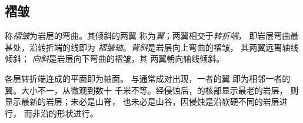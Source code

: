 \subsection{褶皱}

\begin{definition}[褶皱；背斜；向斜；褶皱轴]\label{def:g12:mountain-building:fold}
称\emph{褶皱}为岩层的弯曲。其倾斜的两翼
称为\emph{翼}；两翼相交于\emph{转折端}，
即岩层弯曲最甚处，沿转折端的线即为
\emph{褶皱轴}。\emph{背斜}是岩层向上弯曲的褶皱，
其两翼远离轴线倾斜；
\emph{向斜}是岩层向下弯曲的褶皱，其
两翼朝向轴线倾斜。
\end{definition}

各层转折端连成的平面即为轴面。
与通常成对出现，一者的翼
即为相邻一者的翼。大小不一，从微观到数十
千米不等。经侵蚀后，的核部显示最老的岩层，
则显示最新的岩层；未必是山脊，
也未必是山谷，因侵蚀是沿软硬不同的岩层进行，
而非沿的形状进行。

